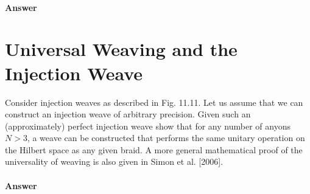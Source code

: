 \documentclass{book}
\begin{document}
\paragraph{Answer}

\section{Universal Weaving and the Injection Weave}
Consider injection weaves as described in Fig. 11.11. Let us assume that we can construct an injection weave of arbitrary precision. Given such an (approximately) perfect injection weave show that for any number of anyons $N >3$, a weave can be constructed that performs the same unitary operation on the Hilbert space as any given braid. A more general mathematical proof of the universality of weaving is also given in Simon et al. [2006].

\paragraph{Answer}





\end{document}
